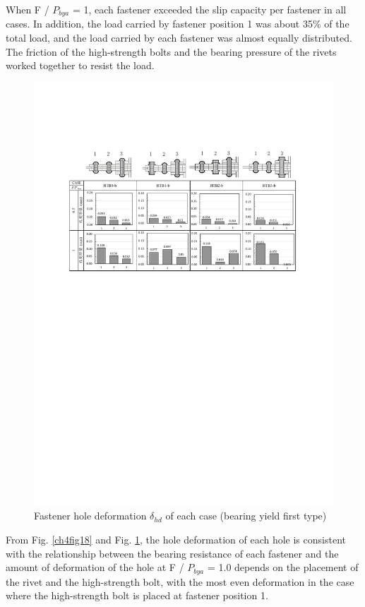 When F / $P_{bya}$  = 1, each fastener exceeded the slip capacity per fastener in all cases. In addition, the load carried by fastener position 1 was about 35\% of the total load, and the load carried by each fastener was almost equally distributed. The friction of the high-strength bolts and the bearing pressure of the rivets worked together to resist the load.

\begin{figure}[htbp]
    \centering
    \includegraphics[width=\textwidth]{imgs/ch4/fig19.pdf}
    \caption{Fastener hole deformation $\delta_{hd}$ of each case (bearing yield first type)}
    \label{ch4fig19}
\end{figure}

From Fig. \ref{ch4fig18} and Fig. \ref{ch4fig19}, the hole deformation of each hole is consistent with the relationship between the bearing resistance of each fastener and the amount of deformation of the hole at F / $P_{bya}$  = 1.0 depends on the placement of the rivet and the high-strength bolt, with the most even deformation in the case where the high-strength bolt is placed at fastener position 1.

